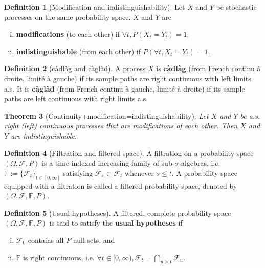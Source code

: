 \documentclass[openany,oneside]{book}
\newtheorem{thm}{Theorem}[section]
\theoremstyle{definition}
\newtheorem{defn}[thm]{Definition}
\theoremstyle{remark}
\begin{document}
\begin{defn}[Modification and indistinguishability]
Let $X$ and $Y$ be stochastic processes on the same probability space. $X$ and $Y$ are
\begin{enumerate}[(i)]
\item \textbf{modifications} (to each other) if $\forall t, P(X_t=Y_t)=1$;
\item \textbf{indistinguishable} (from each other) if $P(\forall t, X_t=Y_t)=1$.
\end{enumerate}
\end{defn}

\begin{defn}[c{\`a}dl{\`a}g and c{\`a}gl{\`a}d]
A process $X$ is \textbf{c{\`a}dl{\`a}g} (from French continu \`a droite, limit\'e \`a gauche) if its sample paths are right continuous with left limits a.s. It is \textbf{c{\`a}gl{\`a}d} (from French continu \`a gauche, limit\'e \`a droite) if its sample paths are left continuous with right limits a.s.
\end{defn}

\begin{thm}[Continuity+modification=indistinguishability]
Let $X$ and $Y$ be a.s. right (left) continuous processes that are modifications of each other. Then $X$ and $Y$ are indistinguishable.  
\end{thm}

\begin{defn}[Filtration and filtered space]
A filtration on a probability space $(\Omega,\mathcal{F},P)$ is a time-indexed increasing family of sub-$\sigma$-algebras, i.e. $\mathbb{F}:=\{\mathcal{F}_t\}_{t\in[0,\infty]}$ satisfying $\mathcal{F}_s \subset \mathcal{F}_t$ whenever $s\le t$. A probability space equipped with a filtration is called a filtered probability space, denoted by $(\Omega,\mathcal{F},\mathbb{F},P)$.
\end{defn}

\begin{defn}[Usual hypotheses]
A filtered, complete probability space $(\Omega,\mathcal{F},\mathbb{F},P)$ is said to satisfy the \textbf{usual hypotheses} if
\begin{enumerate}[(i)]
	\item $\mathcal{F}_0$ contains all $P$-null sets, and
    \item $\mathbb{F}$ is right continuous, i.e. $\forall t\in[0,\infty),\mathcal{F}_t=\bigcap_{u>t}\mathcal{F}_u$.
\end{enumerate}
\end{defn}
\end{document}
